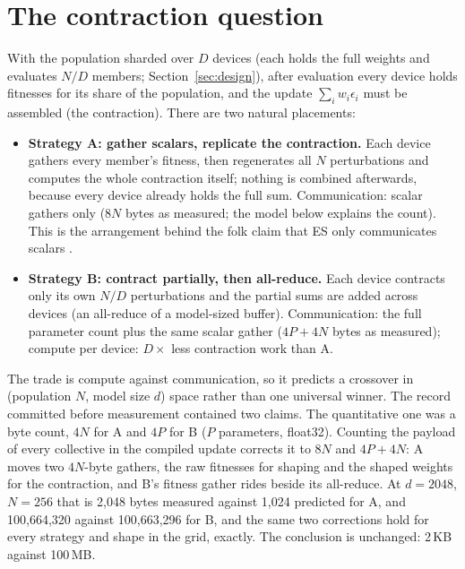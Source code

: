 \section{The contraction question}
\label{sec:contraction}

With the population sharded over $D$ devices (each holds the full weights and
evaluates $N/D$ members; Section~\ref{sec:design}), after evaluation every
device holds fitnesses for its share of the
population, and the update $\sum_i w_i \epsilon_i$ must be assembled (the
contraction). There are two natural placements:

\begin{itemize}
  \item \textbf{Strategy A: gather scalars, replicate the contraction.}
    Each device gathers every member's fitness, then regenerates all $N$
    perturbations and computes the whole contraction itself; nothing is
    combined afterwards, because every device already holds the full sum.
    Communication: scalar gathers only ($8N$ bytes as measured; the model
    below explains the count). This is the
    arrangement behind the folk claim that ES only communicates scalars \citep{salimans2017}.
  \item \textbf{Strategy B: contract partially, then all-reduce.} Each device
    contracts only its own $N/D$ perturbations and the partial sums are added
    across devices (an all-reduce of a model-sized buffer). Communication:
    the full parameter count plus the same scalar gather ($4P{+}4N$ bytes as
    measured); compute per device: $D\times$ less contraction work than A.
\end{itemize}

The trade is compute against communication, so it predicts a crossover in
(population $N$, model size $d$) space rather than one universal winner. The
record committed before measurement contained two claims. The quantitative
one was a byte count, $4N$ for A and $4P$ for B ($P$ parameters, float32).
Counting the payload of every collective in the compiled update corrects it
to $8N$ and $4P{+}4N$: A moves two $4N$-byte gathers, the raw fitnesses for
shaping and the shaped weights for the contraction, and B's fitness gather
rides beside its all-reduce. At $d{=}2048$, $N{=}256$ that is 2{,}048 bytes
measured against 1{,}024 predicted for A, and 100{,}664{,}320 against
100{,}663{,}296 for B, and the same two corrections hold for every strategy
and shape in the grid, exactly. The conclusion is unchanged: 2\,KB against
100\,MB.

